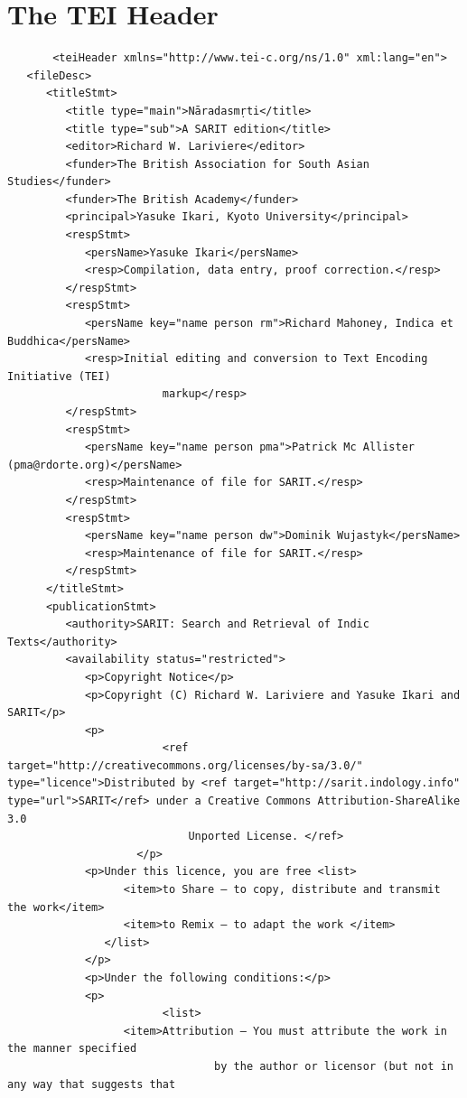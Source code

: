 \documentclass[article,12pt,a4paper]{memoir}%
\begin{document}
	 \chapter{The TEI Header}
	 \begin{verbatim}
       <teiHeader xmlns="http://www.tei-c.org/ns/1.0" xml:lang="en">
   <fileDesc>
      <titleStmt>
         <title type="main">Nāradasmṛti</title>
         <title type="sub">A SARIT edition</title>
         <editor>Richard W. Lariviere</editor>
         <funder>The British Association for South Asian Studies</funder>
         <funder>The British Academy</funder>
         <principal>Yasuke Ikari, Kyoto University</principal>
         <respStmt>
            <persName>Yasuke Ikari</persName>
            <resp>Compilation, data entry, proof correction.</resp>
         </respStmt>
         <respStmt>
            <persName key="name person rm">Richard Mahoney, Indica et Buddhica</persName>
            <resp>Initial editing and conversion to Text Encoding Initiative (TEI)
                        markup</resp>
         </respStmt>
         <respStmt>
            <persName key="name person pma">Patrick Mc Allister (pma@rdorte.org)</persName>
            <resp>Maintenance of file for SARIT.</resp>
         </respStmt>
         <respStmt>
            <persName key="name person dw">Dominik Wujastyk</persName>
            <resp>Maintenance of file for SARIT.</resp>
         </respStmt>
      </titleStmt>
      <publicationStmt>
         <authority>SARIT: Search and Retrieval of Indic Texts</authority>
         <availability status="restricted">
            <p>Copyright Notice</p>
            <p>Copyright (C) Richard W. Lariviere and Yasuke Ikari and SARIT</p>
            <p>
                        <ref target="http://creativecommons.org/licenses/by-sa/3.0/" type="licence">Distributed by <ref target="http://sarit.indology.info" type="url">SARIT</ref> under a Creative Commons Attribution-ShareAlike 3.0
                            Unported License. </ref>
                    </p>
            <p>Under this licence, you are free <list>
                  <item>to Share — to copy, distribute and transmit the work</item>
                  <item>to Remix — to adapt the work </item>
               </list>
            </p>
            <p>Under the following conditions:</p>
            <p>
                        <list>
                  <item>Attribution — You must attribute the work in the manner specified
                                by the author or licensor (but not in any way that suggests that

\end{verbatim}
\end{document}
